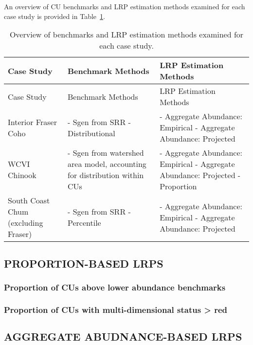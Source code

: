 \documentclass[11pt]{book}
\begin{document}
An overview of CU benchmarks and LRP estimation methods examined for each case study is provided in Table~\ref{tab:csOverview}.
\begin{longtable}[]{@{}
  >{\raggedright\arraybackslash}p{}
  >{\raggedright\arraybackslash}p{}
  >{\raggedright\arraybackslash}p{}@{}}
\caption{\label{tab:csOverview} Overview of benchmarks and LRP estimation methods examined for each case study.}\tabularnewline
\toprule
Case Study & Benchmark Methods & LRP Estimation Methods \\
\midrule
\endfirsthead
\toprule
Case Study & Benchmark Methods & LRP Estimation Methods \\
\midrule
\endhead
Interior Fraser Coho & - Sgen from SRR - Distributional & - Aggregate Abundance: Empirical - Aggregate Abundance: Projected \\
WCVI Chinook & - Sgen from watershed area model, accounting for distribution within CUs & - Aggregate Abundance: Empirical - Aggregate Abundance: Projected - Proportion \\
South Coast Chum (excluding Fraser) & - Sgen from SRR - Percentile & - Aggregate Abundance: Empirical - Aggregate Abundance: Projected \\
\bottomrule
\end{longtable}
\hypertarget{proportion-based-lrps}{%
\subsection{PROPORTION-BASED LRPS}\label{proportion-based-lrps}}

\hypertarget{proportion-of-cus-above-lower-abundance-benchmarks}{%
\subsubsection{Proportion of CUs above lower abundance benchmarks}\label{proportion-of-cus-above-lower-abundance-benchmarks}}

\hypertarget{proportion-of-cus-with-multi-dimensional-status-red}{%
\subsubsection{Proportion of CUs with multi-dimensional status \textgreater{} red}\label{proportion-of-cus-with-multi-dimensional-status-red}}

\hypertarget{aggregate-abudnance-based-lrps}{%
\subsection{AGGREGATE ABUDNANCE-BASED LRPS}\label{aggregate-abudnance-based-lrps}}
\end{document}
